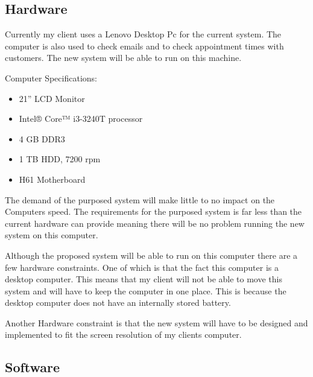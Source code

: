 \subsection{Hardware}

\begin{flushleft}

Currently my client uses a Lenovo Desktop Pc for the current system. The computer is also used to check emails and to check appointment times with customers. The new system will be able to run on this machine.

Computer Specifications:

\begin{itemize}
\item{21'' LCD Monitor}
\item{Intel® Core™ i3-3240T processor}
\item{4 GB DDR3}
\item{1 TB HDD, 7200 rpm}
\item{H61 Motherboard}
\end{itemize}

The demand of the purposed system will make little to no impact on the Computers speed. The requirements for the purposed system is far less than the current hardware can provide meaning there will be no problem running the new system on this computer. \par

Although the proposed system will be able to run on this computer there are a few hardware constraints. One of which is that the fact this computer is a desktop computer. This means that my client will not be able to move this system and will have to keep the computer in one place. This is because the desktop computer does not have an internally stored battery. \par

Another Hardware constraint is that the new system will have to be designed and implemented to fit the screen resolution of my clients computer. \par

\end{flushleft}


\subsection{Software}


